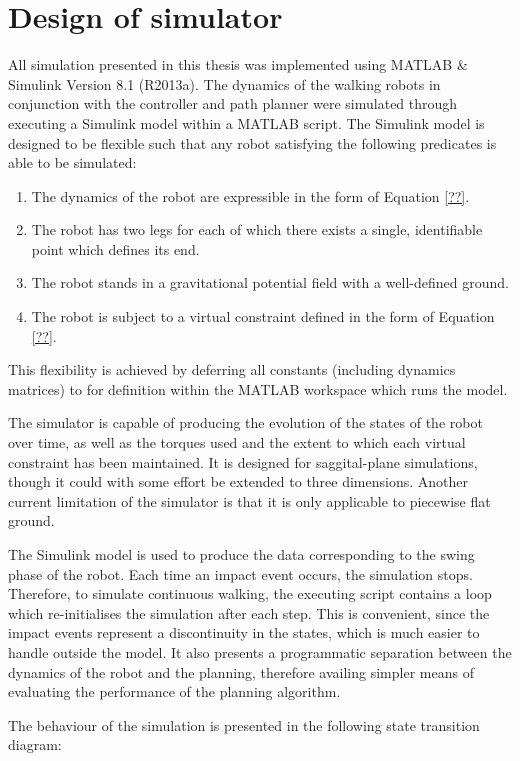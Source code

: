 \section{Design of simulator}
All simulation presented in this thesis was implemented using MATLAB \& Simulink Version 8.1 (R2013a). The dynamics of the walking robots in conjunction with the controller and path planner were simulated through executing a Simulink model within a MATLAB script. The Simulink model is designed to be flexible such that any robot satisfying the following predicates is able to be simulated:
\begin{enumerate}
	\item The dynamics of the robot are expressible in the form of Equation \ref{??}.
	\item The robot has two legs for each of which there exists a single, identifiable point which defines its end.
	\item The robot stands in a gravitational potential field with a well-defined ground.
	\item The robot is subject to a virtual constraint defined in the form of Equation \ref{??}.
\end{enumerate}

This flexibility is achieved by deferring all constants (including dynamics matrices) to for definition within the MATLAB workspace which runs the model.

The simulator is capable of producing the evolution of the states of the robot over time, as well as the torques used and the extent to which each virtual constraint has been maintained. It is designed for saggital-plane simulations, though it could with some effort be extended to three dimensions. Another current limitation of the simulator is that it is only applicable to piecewise flat ground.

The Simulink model is used to produce the data corresponding to the swing phase of the robot. Each time an impact event occurs, the simulation stops. Therefore, to simulate continuous walking, the executing script contains a loop which re-initialises the simulation after each step. This is convenient, since the impact events represent a discontinuity in the states, which is much easier to handle outside the model. It also presents a programmatic separation between the dynamics of the robot and the planning, therefore availing simpler means of evaluating the performance of the planning algorithm.

The behaviour of the simulation is presented in the following {\color{red}state transition diagram}:


